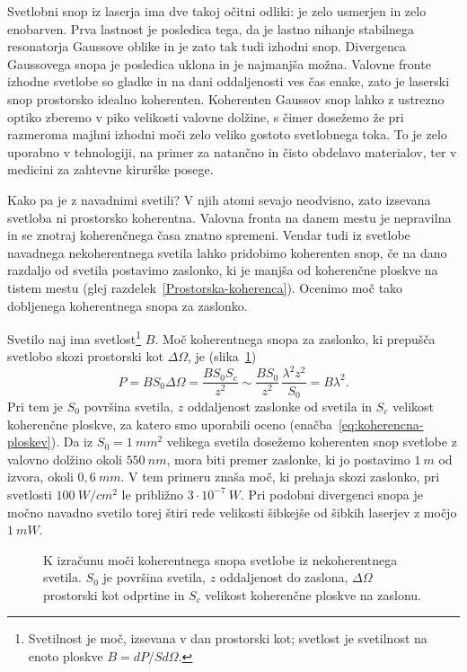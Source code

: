 Svetlobni snop iz laserja ima dve takoj očitni odliki: je zelo
usmerjen in zelo enobarven. Prva lastnost je posledica tega, da je
lastno nihanje stabilnega resonatorja Gaussove oblike in je zato tak tudi
izhodni snop. Divergenca Gaussovega snopa je posledica uklona in je 
najmanjša možna. Valovne fronte izhodne svetlobe so gladke in na dani oddaljenosti ves 
čas enake, zato je laserski snop prostorsko idealno koherenten. 
Koherenten Gaussov snop lahko z ustrezno optiko zberemo v piko velikosti
valovne dolžine, s čimer dosežemo že pri razmeroma majhni izhodni moči zelo veliko
gostoto svetlobnega toka. To je zelo uporabno v tehnologiji, na primer za natančno in
čisto obdelavo materialov, ter v medicini za
zahtevne kirurške posege.

Kako pa je z navadnimi svetili? V njih atomi sevajo neodvisno, zato
izsevana svetloba ni prostorsko koherentna. Valovna fronta na danem 
mestu je nepravilna in se znotraj koherenčnega časa znatno spremeni. 
Vendar tudi iz svetlobe navadnega nekoherentnega svetila lahko pridobimo
koherenten snop, če na dano razdaljo od svetila postavimo zaslonko, ki
je manjša od koherenčne ploskve na tistem mestu (glej 
razdelek~\ref{Prostorska-koherenca}). Ocenimo moč tako dobljenega
koherentnega snopa za zaslonko.

Svetilo naj ima svetlost\footnote{Svetilnost je moč, izsevana v dan 
prostorski kot; svetlost je svetilnost na enoto ploskve
$B= dP/Sd\Omega$.} $B$.  
Moč koherentnega snopa za zaslonko, ki prepušča svetlobo skozi prostorski kot 
$\Delta\Omega$, je (slika~\ref{fig:svetlost})
\begin{equation}
P=BS_{0}\Delta \Omega =\frac{BS_{0}S_{c}}{z^{2}}\sim \frac{BS_{0}}{z^{2}}\,
\frac{\lambda ^{2}z^{2}}{S_{0}}=B\lambda ^{2}.
\label{5.21}
\end{equation}
Pri tem je $S_{0}$ površina svetila, $z$ oddaljenost zaslonke od svetila in
$S_{c}$ velikost koherenčne ploskve, za katero smo uporabili oceno 
(enačba~\ref{eq:koherencna-ploskev}). Da iz $S_0=1~\si{mm}^2$ velikega svetila 
dosežemo koherenten snop svetlobe z valovno dolžino okoli $550~\si{nm}$, 
mora biti premer zaslonke, ki jo postavimo $1~\si{m}$ od izvora, 
okoli $0,6~\si{mm}$. V tem primeru znaša 
moč, ki prehaja skozi zaslonko, pri svetlosti $100~\si{W/cm^{2}}$ 
le približno $3\cdot10^{-7}~\si{W}$.
Pri podobni divergenci snopa je močno navadno svetilo torej štiri rede
velikosti šibkejše od šibkih laserjev z močjo $1~\si{mW}$. 
\begin{figure}[h]
\centering
\def\svgwidth{100truemm} 

\caption{K izračunu moči koherentnega snopa svetlobe iz nekoherentnega svetila. $S_0$
je površina svetila, $z$ oddaljenost do zaslona, $\Delta \Omega$ prostorski kot odprtine
 in $S_c$ velikost koherenčne ploskve na zaslonu.}
\label{fig:svetlost}
\end{figure}

